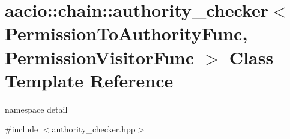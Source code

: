 \hypertarget{classaacio_1_1chain_1_1authority__checker}{}\section{aacio\+:\+:chain\+:\+:authority\+\_\+checker$<$ Permission\+To\+Authority\+Func, Permission\+Visitor\+Func $>$ Class Template Reference}
\label{classaacio_1_1chain_1_1authority__checker}


namespace detail  




{\ttfamily \#include $<$authority\+\_\+checker.\+hpp$>$}

